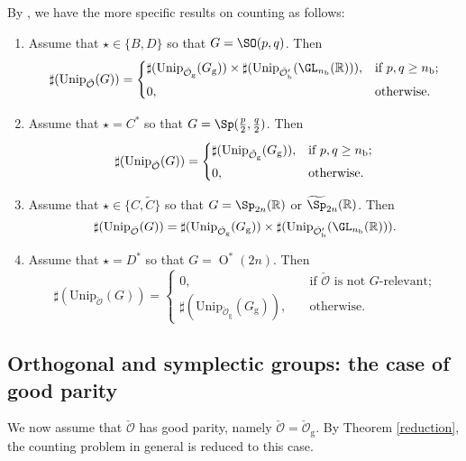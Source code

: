 \documentclass[12pt,a4paper]{amsart}
\newcommand{\CO}{{\mathcal {O}}}
\newcommand{\oO}{\operatorname{O}}
\newcommand{\R}{\mathbb R}
\numberwithin{equation}{section}
\theoremstyle{remark}
\def\Unip{\mathrm{Unip}}
\begin{document}
By , we have the more specific results on counting as follows:
\begin{enumerate}[label=(\alph*)]
  \item Assume that $\star\in \{B,D\}$ so that $G=\SO(p,q)$. Then
        \[
        \sharp(\Unip_{\check \CO}(G))=
        \begin{cases}
          \sharp(\Unip_{\check \CO_{\mathrm g}}(G_{\mathrm g}))\times \sharp(\Unip_{\check \CO'_{\mathrm b}}(\GL_{n_\mathrm b}(\R)) ), &\hbox{if $p,q\geq n_\mathrm b$}; \smallskip\\
          0, &\hbox{otherwise.}
        \end{cases}
        \]
  \item Assume that $\star=C^*$ so that $G=\Sp(\frac{p}{2},\frac{q}{2})$. Then
        \[
        \sharp(\Unip_{\check \CO}(G))=
        \begin{cases}
          \sharp(\Unip_{\check \CO_{\mathrm g}}(G_{\mathrm g} )), &\hbox{if $p,q\geq n_\mathrm b$}; \smallskip\\
          0, &\hbox{otherwise.}
        \end{cases}
        \]

  \item Assume that $\star\in \{C,\widetilde C\}$ so that $G=\Sp_{2n}(\R)$ or
        $\widetilde \Sp_{2n}(\R)$. Then
        \[
        \sharp(\Unip_{\check \CO}(G))= \sharp(\Unip_{\check \CO_{\mathrm g}}(G_{\mathrm g}))\times \sharp(\Unip_{\check \CO'_{\mathrm b}}(\GL_{n_\mathrm b}(\R)) ). \]
  \item Assume that $\star =D^*$ so that $G=\oO^*(2n)$. Then
        \[
          \sharp(\Unip_{\check \CO}(G))=
          \begin{cases}
          0,&\quad \textrm{if $\check \CO$  is not $G$-relevant;}\\
          \sharp(\Unip_{\check \CO_{\mathrm g}}(G_{\mathrm g})),&\quad \textrm{otherwise}.
          \end{cases}
        \]
\end{enumerate}


 \subsection{Orthogonal and symplectic groups: the case of good parity}\label{secorgp0}
 We now assume that $\check \CO$ has good parity, namely
 $\check \CO=\check \CO_{\mathrm g}$. By Theorem \ref{reduction}, the counting
 problem in general is reduced to this case.
\end{document}
